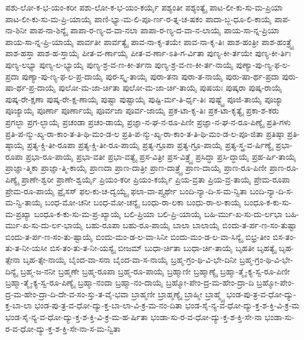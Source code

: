 {ಪಶು-ಲೋ-ಕ-ಭ-ಯಂ-ಕರೀ
ಪಶು-ಲೋ-ಕ-ಭ-ಯಂ-ಕರ್ಯೈ
ಪಶ್ಯಂತೀ
ಪಶ್ಯಂತ್ಯೈ
ಪಾಟ-ಲೀ-ಕು-ಸು-ಮ-ಪ್ರಿಯಾ
ಪಾಟ-ಲೀ-ಕು-ಸು-ಮ-ಪ್ರಿ-ಯಾಯೈ
ಪಾಣಿ-ಭ್ಯಾ-ಮ-ಲಿ-ಪೂ-ರ್ಣ-ರ-ತ್ನ-ಚ-ಷಕಂ
ಪಾದಾ-ಬ್ಜ-ಧೂ-ಲಿ-ಕಾಯೈ
ಪಾಪ-ನಾ-ಶಿನೀ
ಪಾಪ-ನಾ-ಶಿನ್ಯೈ
ಪಾಪಾ-ರ-ಣ್ಯ-ದ-ವಾ-ನಲಾ
ಪಾಪಾ-ರ-ಣ್ಯ-ದ-ವಾ-ನ-ಲಾಯೈ
ಪಾಯ-ಸಾ-ನ್ನ-ಪ್ರಿಯಾ
ಪಾಯ-ಸಾ-ನ್ನ-ಪ್ರಿ-ಯಾಯೈ
ಪಾರ್ವತೀ
ಪಾರ್ವತ್ಯೈ
ಪಾವ-ನಾ-ಕೃ-ತಯೇ
ಪಾವ-ನಾ-ಕೃ-ತಿಃ
ಪಾಶ-ಹಂತ್ರೀ
ಪಾಶ-ಹಂತ್ರ್ಯೈ
ಪಾಶ-ಹಸ್ತಾ
ಪಾಶ-ಹ-ಸ್ತಾಯೈ
ಪೀತ-ವ-ರ್ಣಾಯೈ
ಪೀತ-ವ-ರ್ಣಾ-ಽತಿ-ಗ-ರ್ವಿತಾ
ಪುಣ್ಯ-ಕೀ-ರ್ತಯೇ
ಪುಣ್ಯ-ಕೀ-ರ್ತಿಃ
ಪುಣ್ಯ-ಲಭ್ಯಾ
ಪುಣ್ಯ-ಲ-ಭ್ಯಾಯೈ
ಪುಣ್ಯ-ಶ್ರ-ವ-ಣ-ಕೀ-ರ್ತನಾ
ಪುಣ್ಯ-ಶ್ರ-ವ-ಣ-ಕೀ-ರ್ತ-ನಾಯೈ
ಪುಣ್ಯಾ-ಪು-ಣ್ಯ-ಫ-ಲ-ಪ್ರದಾ
ಪುಣ್ಯಾ-ಪು-ಣ್ಯ-ಫ-ಲ-ಪ್ರ-ದಾಯೈ
ಪುರ-ಸ್ಕೃ-ತಾಯೈ
ಪುರಾ-ತನಾ
ಪುರಾ-ತ-ನಾಯೈ
ಪುರು-ಷಾ-ರ್ಥ-ಪ್ರದಾ
ಪುರು-ಷಾ-ರ್ಥ-ಪ್ರ-ದಾಯೈ
ಪುಲೋ-ಮ-ಜಾ-ರ್ಚಿತಾ
ಪುಲೋ-ಮ-ಜಾ-ರ್ಚಿ-ತಾಯೈ
ಪುಷಯಃ
ಪುಷ್ಕರಾ
ಪುಷ್ಕ-ರಾಯೈ
ಪುಷ್ಕ-ರೇ-ಕ್ಷಣಾ
ಪುಷ್ಕ-ರೇ-ಕ್ಷ-ಣಾಯೈ
ಪುಷ್ಟಾ
ಪುಷ್ಟಾಯೈ
ಪುಷ್ಟಿ-ರ್ಮ-ತಿ-ರ್ಧೃ-ತಿಃ
ಪುಷ್ಟ್ಯೈ
ಪೂಜಿ-ತಾಯೈ
ಪೂಜ್ಯಾ
ಪೂಜ್ಯಾಯೈ
ಪೂರ್ಣಾ
ಪೂರ್ಣಾಯೈ
ಪೂರ್ವಜಾ
ಪೂರ್ವ-ಜಾಯೈ
ಪ್ರಕ-ಟಾ-ಕೃ-ತಿಃ
ಪ್ರಕ-ಟಾ-ಕೃತ್ಯೈ
ಪ್ರಕಾ-ಶ-ಕರು
ಪ್ರಗಲ್ಭಾ
ಪ್ರಗ-ಲ್ಭಾಯೈ
ಪ್ರಚಂಡಾ
ಪ್ರಚಂ-ಡಾಯೈ
ಪ್ರಜ್ಞಾ-ನ-ಘ-ನ-ರೂ-ಪಿಣೀ
ಪ್ರಜ್ಞಾ-ನ-ಘ-ನ-ರೂ-ಪಿಣ್ಯೈ
ಪ್ರತಿ-ಗಳು
ಪ್ರತಿ-ಪ-ನ್ಮು-ಖ್ಯ-ರಾ-ಕಾಂ-ತ-ತಿ-ಥಿ-ಮಂ-ಡ-ಲ
ಪ್ರತಿ-ಪ-ನ್ಮು-ಖ್ಯ-ರಾ-ಕಾಂ-ತ-ತಿ-ಥಿ-ಮಂ-ಡ-ಲ-ಪೂ-ಜಿತಾ
ಪ್ರತಿಷ್ಠಾ
ಪ್ರತಿ-ಷ್ಠಾಯೈ
ಪ್ರತ್ಯ-ಕ್ಚಿ-ತೀ-ರೂಪಾ
ಪ್ರತ್ಯ-ಕ್ಚಿ-ತೀ-ರೂ-ಪಾಯೈ
ಪ್ರತ್ಯ-ಗ್ರೂಪಾ
ಪ್ರತ್ಯ-ಗ್ರೂ-ಪಾಯೈ
ಪ್ರತ್ಯ-ಸ್ತ್ರ-ವ-ರ್ಷಿಣ್ಯೈ
ಪ್ರಭಾ-ರೂಪಾ
ಪ್ರಭಾ-ರೂ-ಪಾಯೈ
ಪ್ರಭಾ-ವತೀ
ಪ್ರಭಾ-ವತ್ಯೈ
ಪ್ರಸ-ವಿತ್ರೀ
ಪ್ರಸ-ವಿತ್ರ್ಯೈ
ಪ್ರಸಿದ್ಧಾ
ಪ್ರಸಿ-ದ್ಧಾಯೈ
ಪ್ರಹ-ರ್ಷಿ-ತಾಯೈ
ಪ್ರಾಜ್ಞಾ-ತ್ಮಿಕಾ
ಪ್ರಾಜ್ಞಾ-ತ್ಮಿ-ಕಾಯೈ
ಪ್ರಾಣದಾ
ಪ್ರಾಣ-ದಾತ್ರೀ
ಪ್ರಾಣ-ದಾತ್ರ್ಯೈ
ಪ್ರಾಣ-ದಾಯೈ
ಪ್ರಾಣ-ರೂ-ಪಿಣೀ
ಪ್ರಾಣ-ರೂ-ಪಿಣ್ಯೈ
ಪ್ರಾಣೇ-ಶ್ವರೀ
ಪ್ರಾಣೇ-ಶ್ವರ್ಯೈ
ಪ್ರಿಯಂ-ಕರೀ
ಪ್ರಿಯಂ-ಕರ್ಯೈ
ಪ್ರಿಯ-ವ್ರತಾ
ಪ್ರಿಯ-ವ್ರ-ತಾಯೈ
ಪ್ರೇಮ-ರೂಪಾ
ಪ್ರೇಮ-ರೂ-ಪಾಯೈ
ಪ್ರೈಸಸ್
ಫಲ-ಕು-ಚ-ದ್ವಯ್ಯೈ
ಫಲಾ-ವಾ-ಪ್ತ್ಯರ್ಥೇ
ಬಂದಿ-ನ್ಯಾ-ದಿ-ಸ-ಮ-ನ್ವಿತಾ
ಬಂದಿ-ನ್ಯಾ-ದಿ-ಸ-ಮ-ನ್ವಿ-ತಾಯೈ
ಬಂಧ-ಮೋ-ಚನೀ
ಬಂಧ-ಮೋ-ಚನ್ಯೈ
ಬಂಧು-ರಾ-ಲಕಾ
ಬಂಧು-ರಾ-ಲ-ಕಾಯೈ
ಬಂಧೂ-ಕ-ಕು-ಸು-ಮ-ಪ್ರಖ್ಯಾ
ಬಂಧೂ-ಕ-ಕು-ಸು-ಮ-ಪ್ರ-ಖ್ಯಾಯೈ
ಬಲಿ-ಪ್ರಿಯಾ
ಬಲಿ-ಪ್ರಿ-ಯಾಯೈ
ಬಹಿ-ರ್ಮು-ಖ-ಸು-ದು-ರ್ಲಭಾ
ಬಹಿ-ರ್ಮು-ಖ-ಸು-ದು-ರ್ಲ-ಭಾಯೈ
ಬಹು-ರೂಪಾ
ಬಹು-ರೂ-ಪಾಯೈ
ಬಾಲಾ
ಬಾಲಾಯೈ
ಬಿಂದು-ತ-ರ್ಪ-ಣ-ಸಂ-ತುಷ್ಟಾ
ಬಿಂದು-ತ-ರ್ಪ-ಣ-ಸಂ-ತು-ಷ್ಟಾಯೈ
ಬಿಂದು-ಮಂ-ಡ-ಲ-ವಾ-ಸಿನೀ
ಬಿಂದು-ಮಂ-ಡ-ಲ-ವಾ-ಸಿನ್ಯೈ
ಬಿಭ್ರ-ತೀಂ
ಬಿಸ-ತಂ-ತು-ತ-ನೀ-ಯಸೀ
ಬಿಸ-ತಂ-ತು-ತ-ನೀ-ಯಸ್ಯೈ
ಬೀಜಮ್
ಬುಧಾ-ರ್ಚಿತಾ
ಬುಧಾ-ರ್ಚಿ-ತಾಯೈ
ಬೃಹತೀ
ಬೃಹತ್ಯೈ
ಬೃಹ-ತ್ಸೇನಾ
ಬೃಹ-ತ್ಸೇ-ನಾಯೈ
ಬೈಂದ-ವಾ-ಸನಾ
ಬೈಂದ-ವಾ-ಸ-ನಾಯೈ
ಬ್ರಹ್ಮ-ಗ್ರಂ-ಥಿ-ವಿ-ಭೇ-ದಿನೀ
ಬ್ರಹ್ಮ-ಗ್ರಂ-ಥಿ-ವಿ-ಭೇ-ದಿನ್ಯೈ
ಬ್ರಹ್ಮ-ಜ-ನನೀ
ಬ್ರಹ್ಮಣೇ
ಬ್ರಹ್ಮ-ರೂಪಾ
ಬ್ರಹ್ಮ-ರೂ-ಪಾಯೈ
ಬ್ರಹ್ಮಾಣೀ
ಬ್ರಹ್ಮಾಣ್ಯೈ
ಬ್ರಹ್ಮಾ-ತ್ಮೈ-ಕ್ಯ-ಸ್ವ-ರೂ-ಪಿಣೀ
ಬ್ರಹ್ಮಾ-ತ್ಮೈ-ಕ್ಯ-ಸ್ವ-ರೂ-ಪಿಣ್ಯೈ
ಬ್ರಹ್ಮಾ-ನಂದಾ
ಬ್ರಹ್ಮಾ-ನಂ-ದಾಯೈ
ಬ್ರಹ್ಮೋ-ಪೇಂ-ದ್ರ-ಮ-ಹೇಂ-ದ್ರಾ-ದಿ
ಬ್ರಹ್ಮೋ-ಪೇಂ-ದ್ರ-ಮ-ಹೇಂ-ದ್ರಾ-ದಿ-ದೇ-ವ-ಸಂ-ಸ್ತು-ತ-ವೈ-ಭವಾ
ಬ್ರಾಹ್ಮಣೀ
ಬ್ರಾಹ್ಮಣ್ಯೈ
ಬ್ರಾಹ್ಮೀ
ಬ್ರಾಹ್ಮ್ಯೈ
ಭಂಡ-ಪು-ತ್ರ-ವ-ಧೋ-ದ್ಯು-ಕ್ತ-ಬಾ-ಲಾ
ಭಂಡ-ಪು-ತ್ರ-ವ-ಧೋ-ದ್ಯು-ಕ್ತ-ಬಾ-ಲಾ-ವಿ-ಕ್ರ-ಮ-ನಂ-ದಿತಾ
ಭಂಡ-ಸೈ-ನ್ಯ-ವ-ಧೋ-ದ್ಯು-ಕ್ತ-ಶ-ಕ್ತಿ-ವಿ-ಕ್ರ-ಮ
ಭಂಡ-ಸೈ-ನ್ಯ-ವ-ಧೋ-ದ್ಯು-ಕ್ತ-ಶ-ಕ್ತಿ-ವಿ-ಕ್ರ-ಮ-ಹ-ರ್ಷಿತಾ
ಭಂಡಾ-ಸು-ರ-ವ-ಧೋ-ದ್ಯು-ಕ್ತ-ಶ-ಕ್ತಿ-ಸೇ-ನಾ
ಭಂಡಾ-ಸು-ರ-ವ-ಧೋ-ದ್ಯು-ಕ್ತ-ಶ-ಕ್ತಿ-ಸೇ-ನಾ-ಸ-ಮ-ನ್ವಿತಾ
}
